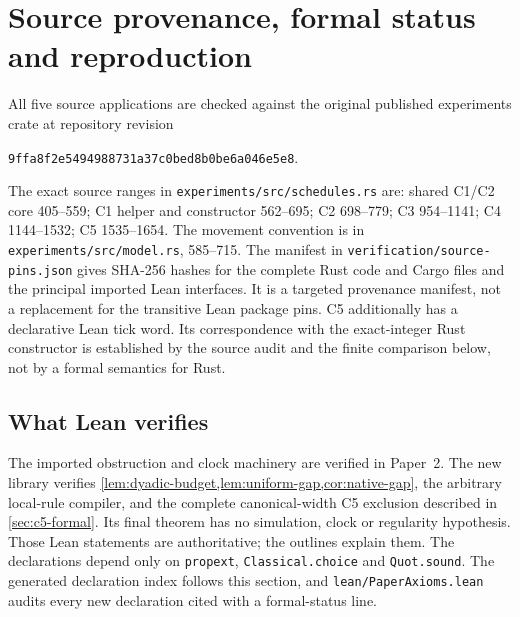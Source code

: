 \section{Source provenance, formal status and reproduction}
\label{sec:verification}

All five source applications are checked against the original published
experiments crate at repository revision
\begin{center}\small\texttt{9ffa8f2e5494988731a37c0bed8b0be6a046e5e8}.\end{center}
The exact source ranges in \texttt{experiments/src/schedules.rs} are:
shared C1/C2 core 405--559; C1 helper and constructor 562--695; C2
698--779; C3 954--1141; C4 1144--1532; C5 1535--1654.
The movement convention is in \texttt{experiments/src/model.rs},
585--715. The manifest in \texttt{verification/source-pins.json} gives
SHA-256 hashes for the complete Rust code and Cargo files and the principal
imported Lean interfaces. It is a targeted provenance manifest, not a
replacement for the transitive Lean package pins.
C5 additionally has a declarative Lean tick word. Its correspondence with
the exact-integer Rust constructor is established by the source audit and
the finite comparison below, not by a formal semantics for Rust.

\subsection{What Lean verifies}

The imported obstruction and clock machinery are verified in Paper~2.
The new library verifies \cref{lem:dyadic-budget,lem:uniform-gap,cor:native-gap},
the arbitrary local-rule compiler, and the complete canonical-width C5
exclusion described in \cref{sec:c5-formal}. Its final theorem has no
simulation, clock or regularity hypothesis. Those Lean statements are authoritative; the
outlines explain them. The declarations depend only on
\texttt{propext}, \texttt{Classical.choice} and \texttt{Quot.sound}.
The generated declaration index follows this section, and
\texttt{lean/PaperAxioms.lean} audits every new declaration cited with
a formal-status line.

